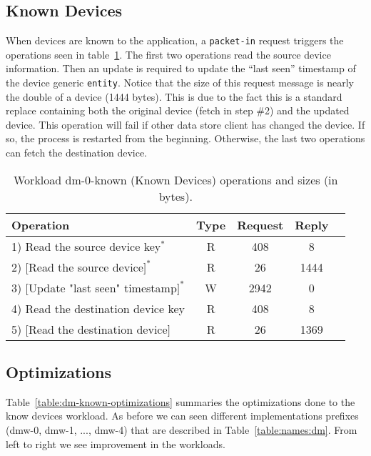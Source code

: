 \subsection{Known Devices}

When devices are known to the application, a \texttt{packet-in} request
triggers the operations seen in table~\ref{table:ops:dm-0-known}. The
first two operations read the source device information. 
Then an update is required to update the ``last seen'' timestamp of the device generic \texttt{entity}. 
Notice that the size of this request message is nearly the double of a device (1444 bytes). 
This is due to the fact this is a standard replace  containing both the original device (fetch in step \#2) and the updated device. 
This operation will fail if other data store client  has changed the device. If so, the process is restarted from the beginning. 
Otherwise, the last two operations can fetch the  destination device. 

\begin{table}[H]
\small
\centering 
\begin{tabular}{l c c c c}
Operation & Type & Request & Reply \\ \toprule 
1) Read the source device key$^*$ & R & 408 & 8\\
2) $[$Read the source device$]^*$ & R & 26 & 1444\\
3) $[$Update "last seen" timestamp$]^*$ & W & 2942 & 0\\
4) Read the destination device key & R & 408 & 8\\
5) $[$Read the destination device$]$ & R & 26 & 1369 \\ \bottomrule 
\end{tabular}
\caption[Workload dm-0-known (Known Devices) operations]{Workload
  dm-0-known (Known Devices) operations and sizes (in bytes).}
\label{table:ops:dm-0-known}
\end{table}


\subsection{Optimizations}

Table~\ref{table:dm-known-optimizations} summaries the optimizations done to the know  devices workload. 
As before we can seen different implementations prefixes (dmw-0, dmw-1, ..., dmw-4) that are described in Table~\ref{table:names:dm}. 
From left to right we see improvement in the workloads. 

